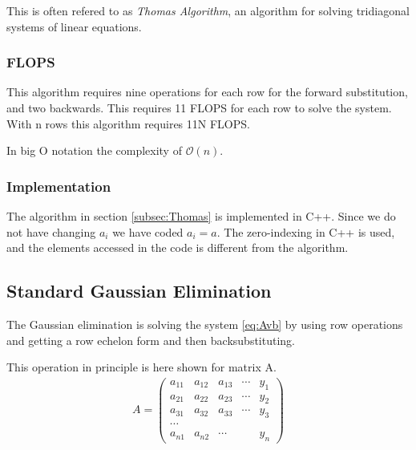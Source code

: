 \documentclass[11pt,a4paper,english,draft]{article}
\numberwithin{equation}{section}
\newcommand{\bigO}[1]{\mathcal{O}\left( #1 \right)}
\begin{document}
This is often refered to as \emph{Thomas Algorithm}, an algorithm for solving tridiagonal systems of linear equations. 

\subsubsection{FLOPS}
This algorithm requires nine operations for each row for the forward substitution,
and two backwards. This requires 11 FLOPS for each row to solve the system.
With n rows this algorithm requires 11N FLOPS.

In big O notation the complexity of $\bigO{n}$.

\subsubsection{Implementation}

The algorithm in section \ref{subsec:Thomas} is implemented in C++.
Since we do not have changing $a_i$ we have coded $a_i = a$.
The zero-indexing in C++ is used, and the elements accessed in the code
is different from the algorithm.

\subsection{Standard Gaussian Elimination}

The Gaussian elimination is solving the system \eqref{eq:Avb} by using 
row operations and getting a row echelon form and then backsubstituting.

This operation in principle is here shown for matrix A.
\begin{gather}
A = \begin{pmatrix}
    a_{11} & a_{12} & a_{13} & \cdots & y_1\\
    a_{21} & a_{22} & a_{23} & \cdots& y_2\\
    a_{31} & a_{32} & a_{33} & \cdots & y_3\\
    \cdots \\
    a_{n1} & a_{n2} & \cdots & & y_n
    \end{pmatrix}
\end{gather}
\end{document}
